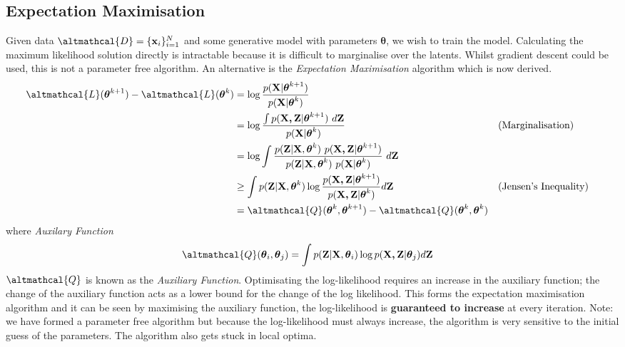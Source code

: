 \documentclass[a4paper]{book}
\newcommand{\vect}[1]{\boldsymbol{\mathbf{#1}}}
\newcommand{\ix}[1]{%
  \leavevmode %
  \marginpar{\small\emph{#1}}%
}
\begin{document}
\subsection*{Expectation Maximisation}
Given data $\altmathcal{D}=\lbrace \vect{x}_i \rbrace_{i=1}^N$ and some generative model with parameters $\vect{\theta}$, we wish to train the model. Calculating the maximum likelihood solution directly is intractable because it is difficult to marginalise over the latents. Whilst gradient descent could be used, this is not a parameter free algorithm. An alternative is the \emph{Expectation Maximisation} algorithm\ix{EM - Derivation via Jensen} which is now derived. 
\begin{align*}
\altmathcal{L}(\vect{\theta}^{k+1}) -\altmathcal{L}(\vect{\theta}^{k}) &= \log \frac{p(\vect{X}|\vect{\theta}^{k+1})}{p(\vect{X}|\vect{\theta}^{k})} \\
&= \log \frac{\int p(\vect{X, Z}|\vect{\theta}^{k+1})\ d\vect{Z}}{p(\vect{X}|\vect{\theta}^{k})} \hspace{1cm}&&(\text{Marginalisation})\\
&= \log \int \frac{p(\vect{Z}|\vect{X}, \vect{\theta}^k)\ p(\vect{X, Z}|\vect{\theta}^{k+1})}{p(\vect{Z}|\vect{X}, \vect{\theta}^k)\ p(\vect{X}|\vect{\theta}^{k})}\ d\vect{Z} \\
&\geq \int p(\vect{Z}|\vect{X}, \vect{\theta}^k) \log \frac{p(\vect{X, Z}|\vect{\theta}^{k+1})}{p(\vect{X, Z}|\vect{\theta}^{k})} d\vect{Z} \hspace{1cm} &&(\text{Jensen's Inequality})\\
&= \altmathcal{Q}(\vect{\theta}^{k}, \vect{\theta}^{k+1}) - \altmathcal{Q}(\vect{\theta}^{k}, \vect{\theta}^{k})
\end{align*}
where \emph{Auxilary Function }
\begin{align}
\altmathcal{Q}(\vect{\theta}_{i}, \vect{\theta}_{j}) &= \int p(\vect{Z}|\vect{X}, \vect{\theta}_i) \log p(\vect{X, Z}|\vect{\theta}_{j}) d\vect{Z}
\end{align} 
$\altmathcal{Q}$ is known as the \emph{Auxiliary Function}. Optimisating the log-likelihood requires an increase in the auxiliary function; the change of the auxiliary function acts as a lower bound for the change of the log likelihood. This forms the expectation maximisation algorithm and it can be seen by maximising the auxiliary function, the log-likelihood is \textbf{guaranteed to increase} at every iteration. Note: we have formed a parameter free algorithm but because the log-likelihood must always increase, the algorithm is very sensitive to the initial guess of the parameters. The algorithm also gets stuck in local optima.  
\end{document}
